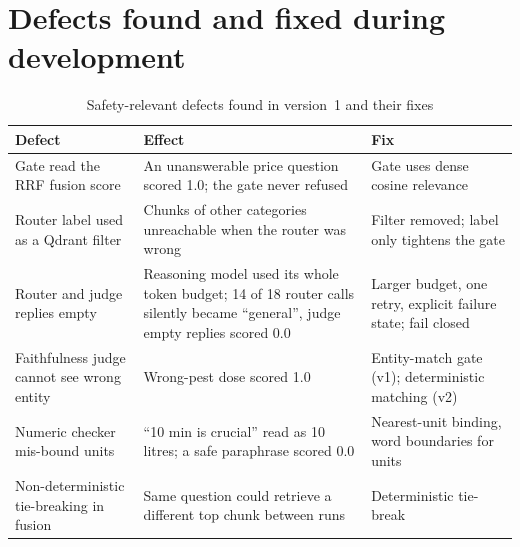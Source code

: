 \section{Defects found and fixed during development}
\label{sec:defects}
\begin{table}[h]
\centering
\small
\caption{Safety-relevant defects found in version~1 and their fixes}
\label{tab:defects}
\begin{tabularx}{\textwidth}{p{3.6cm}XX}
\toprule
Defect & Effect & Fix\\
\midrule
Gate read the RRF fusion score & An unanswerable price question scored 1.0; the gate never refused & Gate uses dense cosine relevance\\
Router label used as a Qdrant filter & Chunks of other categories unreachable when the router was wrong & Filter removed; label only tightens the gate\\
Router and judge replies empty & Reasoning model used its whole token budget; 14 of 18 router calls silently became ``general'', judge empty replies scored 0.0 & Larger budget, one retry, explicit failure state; fail closed\\
Faithfulness judge cannot see wrong entity & Wrong-pest dose scored 1.0 & Entity-match gate (v1); deterministic matching (v2)\\
Numeric checker mis-bound units & ``10 min is crucial'' read as 10 litres; a safe paraphrase scored 0.0 & Nearest-unit binding, word boundaries for units\\
Non-deterministic tie-breaking in fusion & Same question could retrieve a different top chunk between runs & Deterministic tie-break\\
\bottomrule
\end{tabularx}
\end{table}
